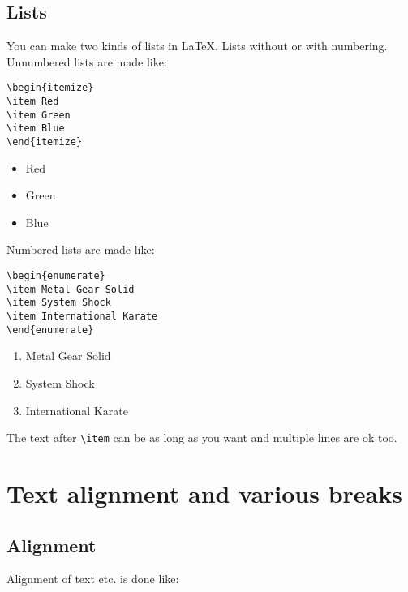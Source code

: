 \subsection{Lists}

You can make two kinds of lists in \LaTeX. Lists without or with
numbering. Unnumbered lists are made like:

\begin{verbatim}
\begin{itemize}
\item Red
\item Green
\item Blue 
\end{itemize}
\end{verbatim}

\begin{itemize}
\item Red
\item Green
\item Blue 
\end{itemize}

Numbered lists are made like:

\begin{verbatim}
\begin{enumerate}
\item Metal Gear Solid
\item System Shock
\item International Karate
\end{enumerate}
\end{verbatim}

\begin{enumerate}
\item Metal Gear Solid
\item System Shock
\item International Karate
\end{enumerate}

The text after \verb+\item+ can be as long as you want and multiple
lines are ok too.

\section{Text alignment and various breaks}

\subsection{Alignment}

Alignment of text etc. is done like:

